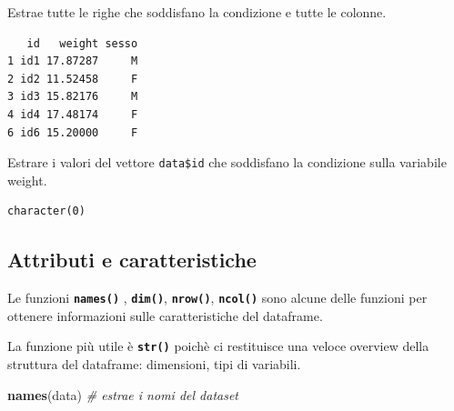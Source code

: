 \documentclass[
  a4paper,
  DIV=11,
  numbers=noendperiod]{scrreprt}
\newenvironment{Shaded}{\begin{snugshade}}{\end{snugshade}}
\newcommand{\CommentTok}[1]{\textcolor[rgb]{0.56,0.35,0.01}{\textit{#1}}}
\newcommand{\DecValTok}[1]{\textcolor[rgb]{0.00,0.00,0.81}{#1}}
\newcommand{\FunctionTok}[1]{\textcolor[rgb]{0.13,0.29,0.53}{\textbf{#1}}}
\newcommand{\NormalTok}[1]{#1}
\newcommand{\SpecialCharTok}[1]{\textcolor[rgb]{0.81,0.36,0.00}{\textbf{#1}}}
\begin{document}
Estrae tutte le righe che soddisfano la condizione e tutte le colonne.

\begin{Shaded}
\end{Shaded}

\begin{verbatim}
   id   weight sesso
1 id1 17.87287     M
2 id2 11.52458     F
3 id3 15.82176     M
4 id4 17.48174     F
6 id6 15.20000     F
\end{verbatim}

Estrare i valori del vettore \texttt{data\$id} che soddisfano la
condizione sulla variabile weight.

\begin{Shaded}
\end{Shaded}

\begin{verbatim}
character(0)
\end{verbatim}

\subsection{Attributi e
caratteristiche}\label{attributi-e-caratteristiche}

Le funzioni \textbf{\texttt{names()}} , \textbf{\texttt{dim()}},
\textbf{\texttt{nrow()}}, \textbf{\texttt{ncol()}} sono alcune delle
funzioni per ottenere informazioni sulle caratteristiche del dataframe.

La funzione più utile è \textbf{\texttt{str()}} poichè ci restituisce
una veloce overview della struttura del dataframe: dimensioni, tipi di
variabili.

\begin{Shaded}
\begin{Highlighting}[]
\FunctionTok{names}\NormalTok{(data) }\CommentTok{\# estrae i nomi del dataset}
\end{Highlighting}
\end{Shaded}
\end{document}

